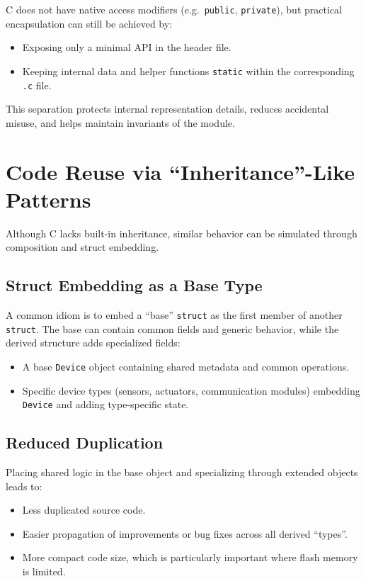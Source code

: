 \documentclass[11pt]{article}
\begin{document}
C does not have native access modifiers (e.g.\ \texttt{public}, \texttt{private}), but practical encapsulation can still be achieved by:
\begin{itemize}[nosep]
  \item Exposing only a minimal API in the header file.
  \item Keeping internal data and helper functions \texttt{static} within the corresponding \texttt{.c} file.
\end{itemize}

This separation protects internal representation details, reduces accidental misuse, and helps maintain invariants of the module.

\section{Code Reuse via ``Inheritance''-Like Patterns}

Although C lacks built-in inheritance, similar behavior can be simulated through composition and struct embedding.

\subsection{Struct Embedding as a Base Type}

A common idiom is to embed a ``base'' \texttt{struct} as the first member of another \texttt{struct}. The base can contain common fields and generic behavior, while the derived structure adds specialized fields:
\begin{itemize}[nosep]
  \item A base \texttt{Device} object containing shared metadata and common operations.
  \item Specific device types (sensors, actuators, communication modules) embedding \texttt{Device} and adding type-specific state.
\end{itemize}

\subsection{Reduced Duplication}

Placing shared logic in the base object and specializing through extended objects leads to:
\begin{itemize}[nosep]
  \item Less duplicated source code.
  \item Easier propagation of improvements or bug fixes across all derived ``types''.
  \item More compact code size, which is particularly important where flash memory is limited.
\end{itemize}
\end{document}
